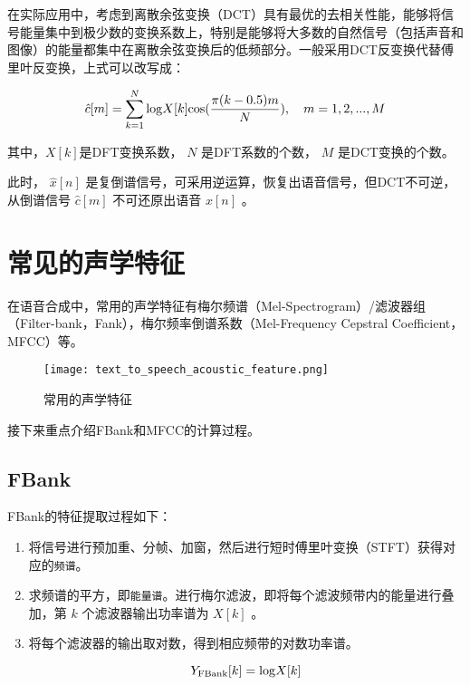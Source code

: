 \documentclass[cn,10pt,math=newtx,citestyle=gb7714-2015,bibstyle=gb7714-2015]{elegantbook}
\begin{document}
在实际应用中，考虑到离散余弦变换（DCT）具有最优的去相关性能，能够将信号能量集中到极少数的变换系数上，特别是能够将大多数的自然信号（包括声音和图像）的能量都集中在离散余弦变换后的低频部分。一般采用DCT反变换代替傅里叶反变换，上式可以改写成：

\begin{equation}
  \hat{c}[m]=\sum_{k=1}^N{\rm log}X[k]{\rm cos}(\frac{\pi (k-0.5)m}{N}),\quad m=1,2,...,M
\end{equation}

其中，$X[k]$是DFT变换系数， $N$ 是DFT系数的个数， $M$ 是DCT变换的个数。

此时， $\hat{x}[n]$ 是复倒谱信号，可采用逆运算，恢复出语音信号，但DCT不可逆，从倒谱信号 $\hat{c}[m]$ 不可还原出语音 $x[n]$ 。

\section{常见的声学特征}

在语音合成中，常用的声学特征有梅尔频谱（Mel-Spectrogram）/滤波器组（Filter-bank，Fank），梅尔频率倒谱系数（Mel-Frequency Cepstral Coefficient，MFCC）等。

\begin{figure}[htbp]
  \centering
  \texttt{[image: text\_to\_speech\_acoustic\_feature.png]}
  \caption{常用的声学特征 \label{fig:acoustic_feature}}
\end{figure}

接下来重点介绍FBank和MFCC的计算过程。

\subsection{FBank}

FBank的特征提取过程如下：

\begin{enumerate}
  \item 将信号进行预加重、分帧、加窗，然后进行短时傅里叶变换（STFT）获得对应的\lstinline{频谱}。
  \item 求频谱的平方，即\lstinline{能量谱}。进行梅尔滤波，即将每个滤波频带内的能量进行叠加，第 $k$ 个滤波器输出功率谱为 $X[k]$ 。
  \item 将每个滤波器的输出取对数，得到相应频带的对数功率谱。
  
  \begin{equation}
    Y_{\rm FBank}[k]={\rm log}X[k]
  \end{equation}
\end{enumerate}
\end{document}
